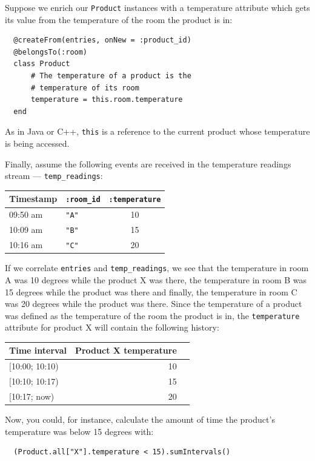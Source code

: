 \documentclass[a4,11pt]{report}
\begin{document}
Suppose we enrich our \verb=Product= instances with a temperature
attribute which gets its value from the temperature of the room the
product is in:

\begin{lstlisting}
  @createFrom(entries, onNew = :product_id)
  @belongsTo(:room)
  class Product
      # The temperature of a product is the
      # temperature of its room
      temperature = this.room.temperature
  end
\end{lstlisting}

As in Java or C++, \verb=this= is a reference to the current product
whose temperature is being accessed.

Finally, assume the following events are received in the temperature
readings stream --- \verb=temp_readings=:

\begin{tabular}{ |l|l|c| }
  \hline
  Timestamp & \verb=:room_id= & \verb=:temperature= \\
  \hline
  09:50 am & \verb="A"= & 10 \\
  10:09 am & \verb="B"= & 15 \\
  10:16 am & \verb="C"= & 20 \\
  \hline
\end{tabular}

If we correlate \verb=entries= and \verb=temp_readings=, we see that
the temperature in room A was 10 degrees while the product X was
there, the temperature in room B was 15 degrees while the product was
there and finally, the temperature in room C was 20 degrees while the
product was there. Since the temperature of a product was defined as
the temperature of the room the product is in, the \verb=temperature=
attribute for product X will contain the following history:

\begin{tabular}{ |l|r|r| }
  \hline
 Time interval & Product X temperature \\
  \hline
  $[$10:00; 10:10) & 10 \\
  $[$10:10; 10:17) & 15 \\
  $[$10:17;   now) & 20 \\
  \hline
\end{tabular}

Now, you could, for instance, calculate the amount of time the
product's temperature was below 15 degrees with:

\begin{lstlisting}
  (Product.all["X"].temperature < 15).sumIntervals()
\end{lstlisting}
\end{document}
